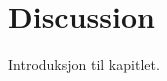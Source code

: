 \documentclass[../../main.tex]{subfiles}
\begin{document}

\chapter{Discussion}

Introduksjon til kapitlet.

\end{document}
